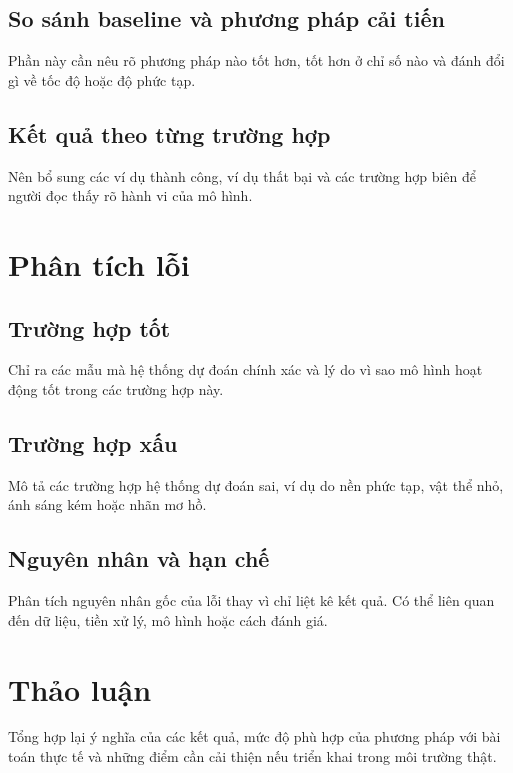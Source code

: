 \subsection{So sánh baseline và phương pháp cải tiến}
Phần này cần nêu rõ phương pháp nào tốt hơn, tốt hơn ở chỉ số nào và đánh đổi gì về tốc độ hoặc độ phức tạp.

\subsection{Kết quả theo từng trường hợp}
Nên bổ sung các ví dụ thành công, ví dụ thất bại và các trường hợp biên để người đọc thấy rõ hành vi của mô hình.

\section{Phân tích lỗi}
\subsection{Trường hợp tốt}
Chỉ ra các mẫu mà hệ thống dự đoán chính xác và lý do vì sao mô hình hoạt động tốt trong các trường hợp này.

\subsection{Trường hợp xấu}
Mô tả các trường hợp hệ thống dự đoán sai, ví dụ do nền phức tạp, vật thể nhỏ, ánh sáng kém hoặc nhãn mơ hồ.

\subsection{Nguyên nhân và hạn chế}
Phân tích nguyên nhân gốc của lỗi thay vì chỉ liệt kê kết quả. Có thể liên quan đến dữ liệu, tiền xử lý, mô hình hoặc cách đánh giá.

\section{Thảo luận}
Tổng hợp lại ý nghĩa của các kết quả, mức độ phù hợp của phương pháp với bài toán thực tế và những điểm cần cải thiện nếu triển khai trong môi trường thật.
